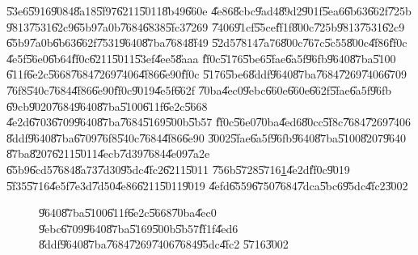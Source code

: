 \bigskip

\U{53e6}\U{5916}\U{9084}\U{8a18}\U{5f97}\U{6211}\U{5011}\U{8b49}\U{660e}%
\U{4e86}\U{8cbc}\U{9ad4}\U{89d2}\U{901f}\U{5ea6}\U{6b63}\U{662f}\U{725b}%
\U{9813}\U{7531}\U{62c9}\U{65b9}\U{7a0b}\U{7684}\U{6838}\U{5fc3}\U{7269}%
\U{7406}\U{91cf}\U{55ce}\U{ff1f}\U{800c}\U{725b}\U{9813}\U{7531}\U{62c9}%
\U{65b9}\U{7a0b}\U{6b63}\U{662f}\U{7531}\U{9640}\U{87ba}\U{7684}\U{8f49}%
\U{52d5}\U{7814}\U{7a76}\U{800c}\U{767c}\U{5c55}\U{800c}\U{4f86}\U{ff0c}%
\U{4e5f}\U{56e0}\U{6b64}\U{ff0c}\U{6211}\U{5011}\U{53ef}\U{4ee5}\U{8aaa}%
\U{ff0c}\U{5176}\U{5be6}\U{5fae}\U{6a5f}\U{96fb}\U{9640}\U{87ba}\U{5100}%
\U{611f}\U{6e2c}\U{5668}\U{7684}\U{7269}\U{7406}\U{4f86}\U{6e90}\U{ff0c}%
\U{5176}\U{5be6}\U{8ddf}\U{9640}\U{87ba}\U{7684}\U{7269}\U{7406}\U{6709}%
\U{76f8}\U{540c}\U{7684}\U{4f86}\U{6e90}\U{ff0c}\U{9019}\U{4e5f}\U{662f}%
\U{70ba}\U{4ec0}\U{9ebc}\U{660e}\U{660e}\U{662f}\U{5fae}\U{6a5f}\U{96fb}%
\U{69cb}\U{9020}\U{7684}\U{9640}\U{87ba}\U{5100}\U{611f}\U{6e2c}\U{5668}%
\U{4e2d}\U{6703}\U{6709}\U{9640}\U{87ba}\U{7684}\U{5169}\U{500b}\U{5b57}%
\U{ff0c}\U{56e0}\U{70ba}\U{4ed6}\U{80cc}\U{5f8c}\U{7684}\U{7269}\U{7406}%
\U{8ddf}\U{9640}\U{87ba}\U{6709}\U{76f8}\U{540c}\U{7684}\U{4f86}\U{6e90}%
\U{3002}\U{5fae}\U{6a5f}\U{96fb}\U{9640}\U{87ba}\U{5100}\U{8207}\U{9640}%
\U{87ba}\U{8207}\U{6211}\U{5011}\U{4ecb}\U{7d39}\U{7684}\U{4e09}\U{7a2e}%
\U{65b9}\U{6cd5}\U{7684}\U{8a73}\U{7d30}\U{95dc}\U{4fc2}\U{6211}\U{5011}%
\U{756b}\U{5728}\U{5716}\ref{gyro_relation_graph}\U{4e2d}\U{ff0c}\U{9019}%
\U{5f35}\U{5716}\U{4e5f}\U{7e3d}\U{7d50}\U{4e86}\U{6211}\U{5011}\U{9019}%
\U{4efd}\U{6559}\U{6750}\U{7684}\U{7dca}\U{5bc6}\U{95dc}\U{4fc2}\U{3002}

\begin{figure}[th]
\caption{\U{9640}\U{87ba}\U{5100}\U{611f}\U{6e2c}\U{5668}\U{70ba}\U{4ec0}%
\U{9ebc}\U{6709}\U{9640}\U{87ba}\U{5169}\U{500b}\U{5b57}\U{ff1f}\U{4ed6}%
\U{8ddf}\U{9640}\U{87ba}\U{7684}\U{7269}\U{7406}\U{7684}\U{95dc}\U{4fc2}%
\U{5716}\U{3002}}
\label{gyro_relation_graph}
\begin{center}

\end{center}
\end{figure}

\clearpage%

